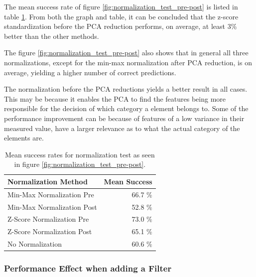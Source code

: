The mean success rate of figure \ref{fig:normalization_test_pre-post} is listed in table \ref{tab:meanSuccess_normalization_test_pre-post}.
From both the graph and table, it can be concluded that the z-score standardization before the PCA reduction performs, on average, at least 3\% better than the other methods.

The figure \ref{fig:normalization_test_pre-post} also shows that in general all three normalizations, except for the min-max normalization after PCA reduction, is on average, yielding a higher number of correct predictions.

The normalization before the PCA reductions yields a better result in all cases. 
This may be because it enables the PCA to find the features being more responsible for the decision of which category a element belongs to. 
Some of the performance improvement can be because of features of a low variance in their measured value, have a larger relevance as to what the actual category of the elements are.

\begin{table}[H]
\centering
\begin{tabular}{|l|r|}\hline
Normalization Method & Mean Success \\ \hline
Min-Max Normalization Pre & 66.7 \% \\ \hline
Min-Max Normalization Post & 52.8 \% \\ \hline
Z-Score Normalization Pre & 73.0 \% \\ \hline
Z-Score Normalization Post & 65.1  \% \\ \hline
No Normalization & 60.6 \% \\ \hline
\end{tabular}
\caption{Mean success rates for normalization test as seen in figure \ref{fig:normalization_test_pre-post}.}
\label{tab:meanSuccess_normalization_test_pre-post}
\end{table}



\subsubsection{Performance Effect when adding a Filter}


